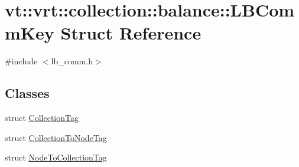 \hypertarget{structvt_1_1vrt_1_1collection_1_1balance_1_1_l_b_comm_key}{}\section{vt\+:\+:vrt\+:\+:collection\+:\+:balance\+:\+:L\+B\+Comm\+Key Struct Reference}
\label{structvt_1_1vrt_1_1collection_1_1balance_1_1_l_b_comm_key}


{\ttfamily \#include $<$lb\+\_\+comm.\+h$>$}

\subsection*{Classes}
\begin{DoxyCompactItemize}
\item 
struct \hyperlink{structvt_1_1vrt_1_1collection_1_1balance_1_1_l_b_comm_key_1_1_collection_tag}{Collection\+Tag}
\item 
struct \hyperlink{structvt_1_1vrt_1_1collection_1_1balance_1_1_l_b_comm_key_1_1_collection_to_node_tag}{Collection\+To\+Node\+Tag}
\item 
struct \hyperlink{structvt_1_1vrt_1_1collection_1_1balance_1_1_l_b_comm_key_1_1_node_to_collection_tag}{Node\+To\+Collection\+Tag}
\end{DoxyCompactItemize}
